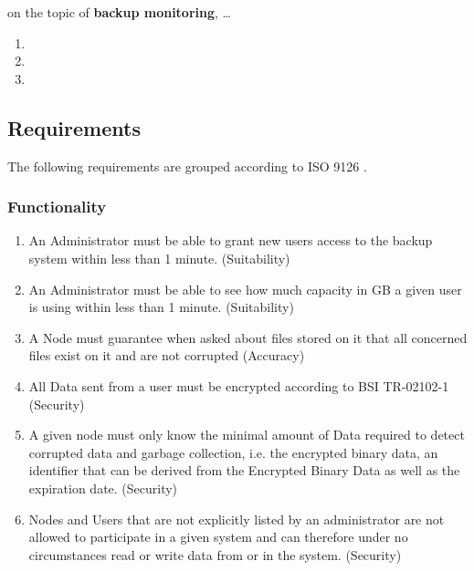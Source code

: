 \begin{flushright}
on the topic of \textbf{backup monitoring}, \ldots{}
\end{flushright}

\begin{enumerate}
	\enumcountrestore
	\item {}
	\item {}
	\item {}
\end{enumerate}


\subsection{Requirements}

The following requirements are grouped according to ISO 9126 \cite{ISO9126}.

\subsubsection{Functionality}

\begin{enumerate}
	\item An Administrator must be able to grant new users access to the backup system within less than 1 minute. (Suitability)
	\item An Administrator must be able to see how much capacity in GB a given user is using within less than 1 minute. (Suitability)
	\item A Node must guarantee when asked about files stored on it that all concerned files exist on it and are not corrupted (Accuracy)
	\item All Data sent from a user must be encrypted according to BSI TR-02102-1 \cite{bsi-tr-02102-1} (Security)
	\item A given node must only know the minimal amount of Data required to detect corrupted data and garbage collection, i.e. the encrypted binary data, an identifier that can be derived from the Encrypted Binary Data as well as the expiration date. (Security)
	\item Nodes and Users that are not explicitly listed by an administrator are not allowed to participate in a given system and can therefore under no circumstances read or write data from or in the system. (Security)
	\enumcountsave
\end{enumerate}

